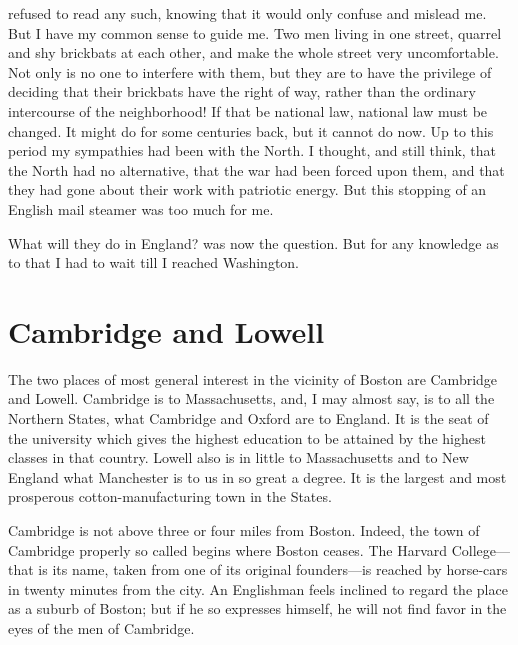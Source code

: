 refused to read any such, knowing that it would only confuse and
mislead me.  But I have my common sense to guide me.  Two men
living in one street, quarrel and shy brickbats at each other, and
make the whole street very uncomfortable.  Not only is no one to
interfere with them, but they are to have the privilege of deciding
that their brickbats have the right of way, rather than the
ordinary intercourse of the neighborhood!  If that be national law,
national law must be changed.  It might do for some centuries back,
but it cannot do now.  Up to this period my sympathies had been
with the North.  I thought, and still think, that the North had no
alternative, that the war had been forced upon them, and that they
had gone about their work with patriotic energy.  But this stopping
of an English mail steamer was too much for me.

What will they do in England? was now the question.  But for any
knowledge as to that I had to wait till I reached Washington.



\chapter{Cambridge and Lowell}


The two places of most general interest in the vicinity of Boston
are Cambridge and Lowell.  Cambridge is to Massachusetts, and, I
may almost say, is to all the Northern States, what Cambridge and
Oxford are to England.  It is the seat of the university which
gives the highest education to be attained by the highest classes
in that country.  Lowell also is in little to Massachusetts and to
New England what Manchester is to us in so great a degree.  It is
the largest and most prosperous cotton-manufacturing town in the
States.

Cambridge is not above three or four miles from Boston.  Indeed,
the town of Cambridge properly so called begins where Boston
ceases.  The Harvard College---that is its name, taken from one of
its original founders---is reached by horse-cars in twenty minutes
from the city.  An Englishman feels inclined to regard the place as
a suburb of Boston; but if he so expresses himself, he will not
find favor in the eyes of the men of Cambridge.

